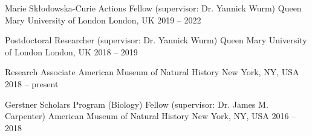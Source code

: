 {\color{awesome}\faBusinessTime}


\begin{cventries}

  \cventry
    {Marie Skłodowska-Curie Actions Fellow (supervisor: Dr. Yannick Wurm)} %
    {Queen Mary University of London} %
    {London, UK} %
    {2019 – 2022} %
    {
    }

  \cventry
    {Postdoctoral Researcher (supervisor: Dr. Yannick Wurm)} %
    {Queen Mary University of London} %
    {London, UK} %
    {2018 – 2019} %
    {
    }

  \cventry
    {Research Associate} %
    {American Museum of Natural History} %
    {New York, NY, USA} %
    {2018 – present} %
    {
    }

  \cventry
    {Gerstner Scholars Program (Biology) Fellow (supervisor: Dr. James M. Carpenter)} %
    {American Museum of Natural History} %
    {New York, NY, USA} %
    {2016 – 2018} %
    {
    }
\end{cventries}
